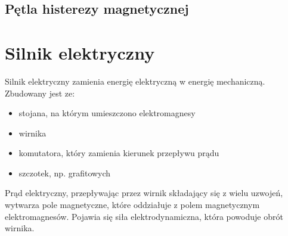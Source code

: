 \subsection{Pętla histerezy magnetycznej}

\section{Silnik elektryczny}
Silnik elektryczny zamienia energię elektryczną w energię mechaniczną. Zbudowany jest ze:
\begin{itemize}
  \item stojana, na którym umieszczono elektromagnesy
  \item wirnika
  \item komutatora, który zamienia kierunek przepływu prądu
  \item szczotek, np. grafitowych
\end{itemize}

Prąd elektryczny, przepływając przez wirnik składający się z wielu uzwojeń, wytwarza pole
magnetyczne, które oddziałuje z polem magnetycznym elektromagnesów. Pojawia się siła
elektrodynamiczna, która powoduje obrót wirnika.
